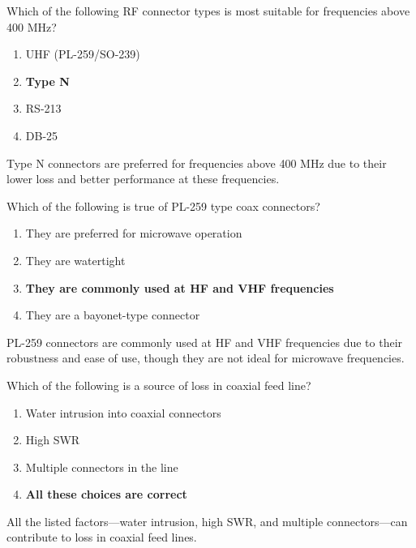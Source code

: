 
\begin{tcolorbox}[colback=gray!10!white,colframe=black!75!black,title={T9B06}]
    Which of the following RF connector types is most suitable for frequencies above 400 MHz?
    \begin{enumerate}[label=\Alph*),noitemsep]
        \item UHF (PL-259/SO-239)
        \item \textbf{Type N}
        \item RS-213
        \item DB-25
    \end{enumerate}
\end{tcolorbox}
Type N connectors are preferred for frequencies above 400 MHz due to their lower loss and better performance at these frequencies.


\begin{tcolorbox}[colback=gray!10!white,colframe=black!75!black,title={T9B07}]
    Which of the following is true of PL-259 type coax connectors?
    \begin{enumerate}[label=\Alph*),noitemsep]
        \item They are preferred for microwave operation
        \item They are watertight
        \item \textbf{They are commonly used at HF and VHF frequencies}
        \item They are a bayonet-type connector
    \end{enumerate}
\end{tcolorbox}
PL-259 connectors are commonly used at HF and VHF frequencies due to their robustness and ease of use, though they are not ideal for microwave frequencies.


\begin{tcolorbox}[colback=gray!10!white,colframe=black!75!black,title={T9B08}]
    Which of the following is a source of loss in coaxial feed line?
    \begin{enumerate}[label=\Alph*),noitemsep]
        \item Water intrusion into coaxial connectors
        \item High SWR
        \item Multiple connectors in the line
        \item \textbf{All these choices are correct}
    \end{enumerate}
\end{tcolorbox}
All the listed factors—water intrusion, high SWR, and multiple connectors—can contribute to loss in coaxial feed lines.

